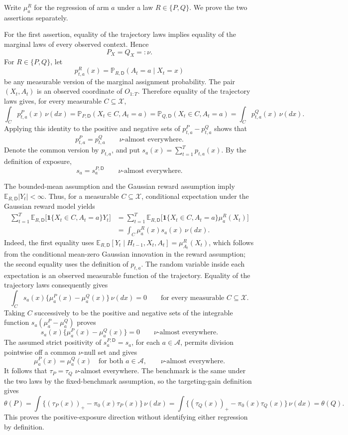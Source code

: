 Write \(\mu_a^R\) for the regression of arm \(a\) under a law \(R\in\{P,Q\}\).  We prove the two assertions separately.

For the first assertion, equality of the trajectory laws implies equality of the marginal laws of every observed context.  Hence
\[
P_X=Q_X=:\nu.
\]
For \(R\in\{P,Q\}\), let
\[
p_{t,a}^R(x)=\mathbb P_{R,\mathsf D}(A_t=a\mid X_t=x)
\]
be any measurable version of the marginal assignment probability.  The pair \((X_t,A_t)\) is an observed coordinate of \(O_{1:T}\).  Therefore equality of the trajectory laws gives, for every measurable \(C\subseteq\mathcal X\),
\[
\int_C p_{t,a}^P(x)\,\nu(dx)
=\mathbb P_{P,\mathsf D}(X_t\in C,A_t=a)
=\mathbb P_{Q,\mathsf D}(X_t\in C,A_t=a)
=\int_C p_{t,a}^Q(x)\,\nu(dx).
\]
Applying this identity to the positive and negative sets of \(p_{t,a}^P-p_{t,a}^Q\) shows that
\[
p_{t,a}^P=p_{t,a}^Q\qquad \nu\text{-almost everywhere}.
\]
Denote the common version by \(p_{t,a}\), and put \(s_a(x)=\sum_{t=1}^T p_{t,a}(x)\).  By the definition of exposure,
\[
s_a=s_a^{P,\mathsf D}\qquad \nu\text{-almost everywhere}.
\]

The bounded-mean assumption and the Gaussian reward assumption imply \(\mathbb E_{R,\mathsf D}|Y_t|<\infty\).  Thus, for a measurable \(C\subseteq\mathcal X\), conditional expectation under the Gaussian reward model yields
\[
\begin{aligned}
\sum_{t=1}^T
\mathbb E_{R,\mathsf D}
 \bigl[\mathbf 1\{X_t\in C,A_t=a\}Y_t\bigr]
&=\sum_{t=1}^T
\mathbb E_{R,\mathsf D}
 \bigl[\mathbf 1\{X_t\in C,A_t=a\}\mu_a^R(X_t)\bigr]\\
&=\int_C \mu_a^R(x)s_a(x)\,\nu(dx).
\end{aligned}
\]
Indeed, the first equality uses
\(\mathbb E_{R,\mathsf D}[Y_t\mid H_{t-1},X_t,A_t]
=\mu_{A_t}^R(X_t)\), which follows from the conditional mean-zero Gaussian innovation in the reward assumption; the second equality uses the definition of \(p_{t,a}\).  The random variable inside each expectation is an observed measurable function of the trajectory.  Equality of the trajectory laws consequently gives
\[
\int_C s_a(x)\{\mu_a^P(x)-\mu_a^Q(x)\}\,\nu(dx)=0
\qquad\text{for every measurable }C\subseteq\mathcal X.
\]
Taking \(C\) successively to be the positive and negative sets of the integrable function
\(s_a(\mu_a^P-\mu_a^Q)\) proves
\[
s_a(x)\{\mu_a^P(x)-\mu_a^Q(x)\}=0
\qquad \nu\text{-almost everywhere}.
\]
The assumed strict positivity of \(s_a^{P,\mathsf D}=s_a\), for each \(a\in\mathcal A\), permits division pointwise off a common \(\nu\)-null set and gives
\[
\mu_a^P(x)=\mu_a^Q(x)
\quad\text{for both }a\in\mathcal A,
\qquad \nu\text{-almost everywhere}.
\]
It follows that \(\tau_P=\tau_Q\) \(\nu\)-almost everywhere.  The benchmark is the same under the two laws by the fixed-benchmark assumption, so the targeting-gain definition gives
\[
\theta(P)
=\int\{(\tau_P(x))_+-\pi_0(x)\tau_P(x)\}\,\nu(dx)
=\int\{(\tau_Q(x))_+-\pi_0(x)\tau_Q(x)\}\,\nu(dx)
=\theta(Q).
\]
This proves the positive-exposure direction without identifying either regression by definition.

